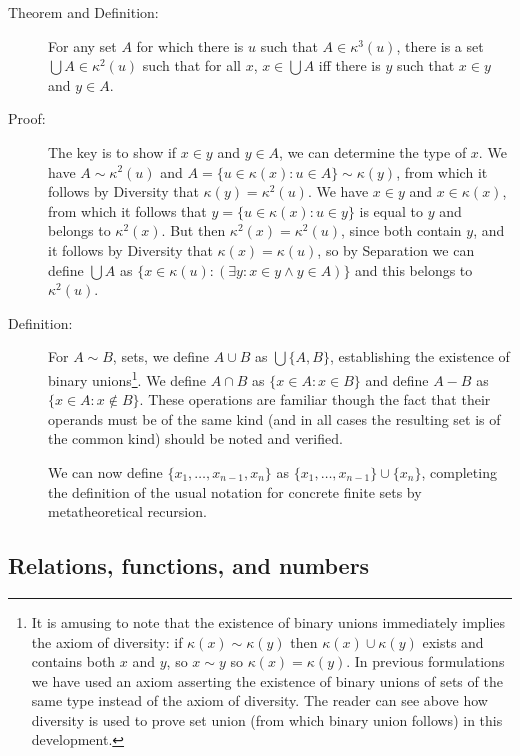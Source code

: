 \documentclass[12pt]{article}
\begin{document}
\begin{description}

\item[Theorem and Definition:]  For any set $A$ for which there is $u$ such that $A \in \kappa^3(u)$, there is a set $\bigcup A\in \kappa^2(u)$ such that for all $x$,
$x \in \bigcup A$ iff there is $y$ such that $x \in y$ and $y \in A$.

\item[Proof:]  The key is to show if $x \in y$ and $y \in A$, we can determine the type of $x$.
We have $A \sim \kappa^2(u)$ and $A = \{u \in \kappa(x):u \in A\} \sim \kappa(y)$, from which it follows by Diversity that
$\kappa(y)=\kappa^2(u)$.  We have $x \in y$ and $x \in \kappa(x)$, from which it follows
that $y = \{u \in \kappa(x):u \in y\}$ is equal to $y$ and belongs to $\kappa^2(x)$.  But then
$\kappa^2(x) = \kappa^2(u)$, since both contain $y$, and it follows by Diversity that
$\kappa(x)=\kappa(u)$, so by Separation we can define $\bigcup A$ as $\{x \in \kappa(u):(\exists y:x \in y \wedge y \in A)\}$ and this belongs to $\kappa^2(u)$.

\item[Definition:]  For $A \sim B$, sets, we define $A \cup B$ as $\bigcup \{A,B\}$, establishing the existence of binary unions\footnote{It is amusing to note that the existence of binary unions immediately implies the axiom of diversity:  if $\kappa(x) \sim \kappa(y)$ then $\kappa(x) \cup \kappa(y)$ exists and contains both $x$ and $y$, so $x \sim y$ so $\kappa(x)=\kappa(y)$.  In previous formulations we have used an axiom asserting the existence of binary unions of sets of the same type instead of the axiom of diversity.  The reader can see above how diversity is used to prove set union (from which binary union follows) in this development.}.  We define
$A \cap B$ as $\{x \in A:x \in B\}$ and define $A-B$ as $\{x \in A:x \not\in B\}$.  These operations are familiar though the fact that their operands must be of the same kind (and in all cases the resulting set is of the common kind) should be noted and verified.  



We can now define $\{x_1,\ldots,x_{n-1},x_n\}$ as $\{x_1,\ldots,x_{n-1}\}\cup \{x_n\}$, completing the definition of the usual notation for concrete finite sets by metatheoretical recursion.

\end{description}

\subsection{Relations, functions, and numbers}
\end{document}
